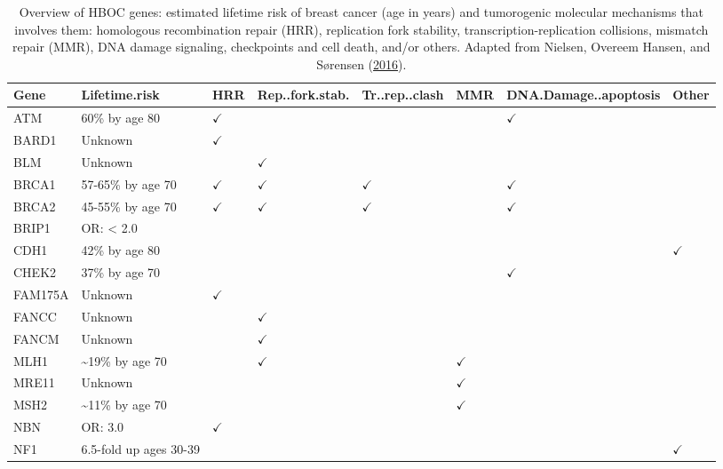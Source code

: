 \documentclass[
  11pt,
]{env/yjiao}
\begin{document}
\begin{landscape}\begin{table}

\caption{\label{tab:hboc-genes}Overview of HBOC genes: estimated lifetime risk of breast cancer (age in years) and tumorogenic molecular mechanisms that involves them: homologous recombination repair (HRR), replication fork stability, transcription-replication collisions, mismatch repair (MMR), DNA damage signaling, checkpoints and cell death, and/or others. Adapted from Nielsen, Overeem Hansen, and Sørensen (\protect\hyperlink{ref-nielsen_hereditary_2016}{2016}).}
\centering
\begin{tabular}[t]{llllllll}
\toprule
Gene & Lifetime.risk & HRR & Rep..fork.stab. & Tr..rep..clash & MMR & DNA.Damage..apoptosis & Other\\
\midrule
\rowcolor{gray!6}  ATM & 60\% by age 80 & \(\checkmark\) &  &  &  & \(\checkmark\) & \\
BARD1 & Unknown & \(\checkmark\) &  &  &  &  & \\
\rowcolor{gray!6}  BLM & Unknown &  & \(\checkmark\) &  &  &  & \\
BRCA1 & 57-65\% by age 70 & \(\checkmark\) & \(\checkmark\) & \(\checkmark\) &  & \(\checkmark\) & \\
\rowcolor{gray!6}  BRCA2 & 45-55\% by age 70 & \(\checkmark\) & \(\checkmark\) & \(\checkmark\) &  & \(\checkmark\) & \\
\addlinespace
BRIP1 & OR: < 2.0 &  &  &  &  &  & \\
\rowcolor{gray!6}  CDH1 & 42\% by age 80 &  &  &  &  &  & \(\checkmark\)\\
CHEK2 & 37\% by age 70 &  &  &  &  & \(\checkmark\) & \\
\rowcolor{gray!6}  FAM175A & Unknown & \(\checkmark\) &  &  &  &  & \\
FANCC & Unknown &  & \(\checkmark\) &  &  &  & \\
\addlinespace
\rowcolor{gray!6}  FANCM & Unknown &  & \(\checkmark\) &  &  &  & \\
MLH1 & \textasciitilde{}19\% by age 70 &  & \(\checkmark\) &  & \(\checkmark\) &  & \\
\rowcolor{gray!6}  MRE11 & Unknown &  &  &  & \(\checkmark\) &  & \\
MSH2 & \textasciitilde{}11\% by age 70 &  &  &  & \(\checkmark\) &  & \\
\rowcolor{gray!6}  NBN & OR: 3.0 & \(\checkmark\) &  &  &  &  & \\
\addlinespace
NF1 & 6.5-fold up ages 30-39 &  &  &  &  &  & \(\checkmark\)\\

\end{tabular}
\end{table}
\end{landscape}
\end{document}
